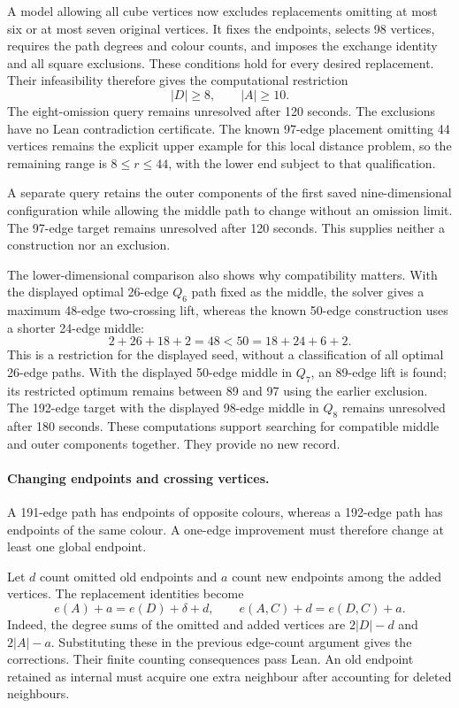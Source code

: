 \documentclass[11pt,a4paper]{article}
\begin{document}
A model allowing all cube vertices now excludes replacements omitting
at most six or at most seven original vertices. It fixes the endpoints,
selects 98 vertices, requires the path degrees and colour counts, and
imposes the exchange identity and all square exclusions. These
conditions hold for every desired replacement. Their infeasibility
therefore gives the computational restriction
\[
|D|\ge8,\qquad |A|\ge10.
\]
The eight-omission query remains unresolved after 120 seconds.
The exclusions have no Lean contradiction certificate. The known
97-edge placement omitting 44 vertices remains the explicit upper
example for this local distance problem, so the remaining range is
$8\le r\le44$, with the lower end subject to that qualification.

A separate query retains the outer components of the first saved
nine-dimensional configuration while allowing the middle path to change
without an omission limit. The 97-edge target remains unresolved after
120 seconds. This supplies neither a construction nor an exclusion.


The lower-dimensional comparison also shows why compatibility matters.
With the displayed optimal 26-edge $Q_6$ path fixed as the middle,
the solver gives a maximum 48-edge two-crossing lift, whereas the
known 50-edge construction uses a shorter 24-edge middle:
\[
2+26+18+2=48<50=18+24+6+2.
\]
This is a restriction for the displayed seed, without a classification
of all optimal 26-edge paths. With the displayed 50-edge middle in
$Q_7$, an 89-edge lift is found; its restricted optimum remains
between 89 and 97 using the earlier exclusion. The 192-edge target
with the displayed 98-edge middle in $Q_8$ remains unresolved after
180 seconds. These computations support searching for compatible
middle and outer components together. They provide no new record.



\paragraph{Changing endpoints and crossing vertices.}
A 191-edge path has endpoints of opposite colours, whereas a
192-edge path has endpoints of the same colour. A one-edge improvement
must therefore change at least one global endpoint.

Let $d$ count omitted old endpoints and $a$ count new endpoints among
the added vertices. The replacement identities become
\[
e(A)+a=e(D)+\delta+d,\qquad e(A,C)+d=e(D,C)+a.
\]
Indeed, the degree sums of the omitted and added vertices are
$2|D|-d$ and $2|A|-a$. Substituting these in the previous edge-count
argument gives the corrections. Their finite counting consequences
pass Lean. An old endpoint retained as internal must acquire one
extra neighbour after accounting for deleted neighbours.
\end{document}
